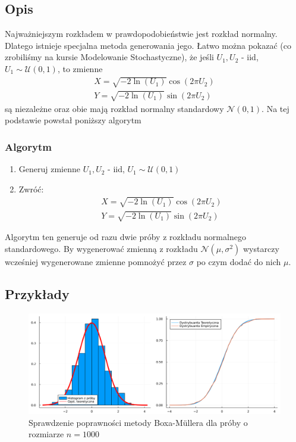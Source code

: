 \documentclass[12pt]{mwrep}
\begin{document}
	\subsection{Opis}
	\noindent Najważniejszym rozkładem w prawdopodobieństwie jest rozkład normalny. Dlatego istnieje specjalna metoda generowania jego. Łatwo można pokazać (co zrobiliśmy na kursie Modelowanie Stochastyczne), że jeśli $U_1,U_2$ - iid, $U_1\sim\mathcal{U}(0,1)$, to zmienne
	\begin{equation}\label{eq:B-M}
		\begin{split}
			X=\sqrt{-2\ln(U_1)}\cos(2\pi U_2)\\
			Y=\sqrt{-2\ln(U_1)}\sin(2\pi U_2)
		\end{split}
	\end{equation}
	są niezależne oraz obie mają rozkład normalny standardowy $\mathcal{N}(0,1)$. Na tej podstawie powstał poniższy algorytm
	\subsubsection{Algorytm}
	\begin{enumerate}[leftmargin=10mm]
		\item Generuj zmienne $U_1, U_2$ - iid, $U_1\sim\mathcal{U}(0,1)$
		\item Zwróć:
		\begin{equation}
			\begin{split}
				X=\sqrt{-2\ln(U_1)}\cos\left(2\pi U_2\right)\\
				Y=\sqrt{-2\ln(U_1)}\sin\left(2\pi U_2\right)
			\end{split}
		\end{equation}
	\end{enumerate}
	Algorytm ten generuje od razu dwie próby z rozkładu normalnego standardowego. By wygenerować zmienną z rozkładu $\mathcal{N}(\mu,\sigma^2)$ wystarczy wcześniej wygenerowane zmienne pomnożyć przez $\sigma$ po czym dodać do nich $\mu$.
	\subsection{Przykłady}
	
	\begin{figure}[H]\caption{Sprawdzenie poprawności metody Boxa-M\"ullera dla próby o rozmiarze $n=1000$}\label{fig:BM}
		\includegraphics[width=\columnwidth]{fig/fig_BM.png}
	\end{figure}
	
\end{document}
